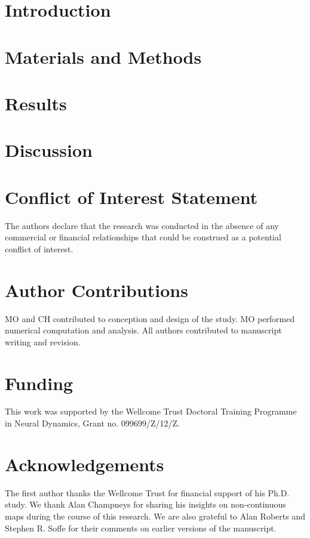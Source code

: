 \documentclass[utf8, draft]{frontiersFPHY} %
\begin{document}
\section{Introduction}
\section{Materials and Methods}


\section{Results}


\section{Discussion}


\section*{Conflict of Interest Statement}
The authors declare that the research was conducted in the absence of any commercial or financial relationships that could be construed as a potential conflict of interest.

\section*{Author Contributions}
MO and CH contributed to conception and design of the study.
MO performed numerical computation and analysis.
All authors contributed to manuscript writing and revision.

\section*{Funding}
This work was supported by the Wellcome Trust Doctoral Training Programme in Neural Dynamics, Grant no. 099699/Z/12/Z.

\section*{Acknowledgements}
The first author thanks the Wellcome Trust for financial support of his Ph.D. study.
We thank Alan Champneys for sharing his insights on non-continuous maps during the course of this research.
We are also grateful to Alan Roberts and Stephen R. Soffe for their comments on earlier versions of the manuscript.
\end{document}
